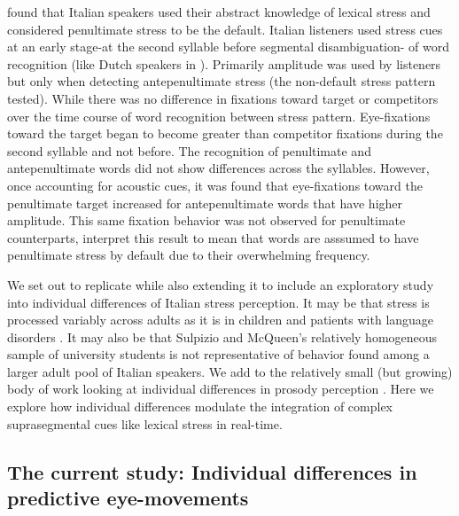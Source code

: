\cite{Sulpizio_McQueen_2012} found that Italian speakers used their abstract knowledge of lexical stress and considered penultimate stress to be the default. Italian listeners used stress cues at an early stage-at the second syllable before segmental disambiguation- of word recognition (like Dutch speakers in \cite{Reinisch2010}). Primarily amplitude was used by listeners but only when detecting antepenultimate stress (the non-default stress pattern tested). While there was no difference in fixations toward target or competitors over the time course of word recognition between stress pattern. Eye-fixations toward the target began to become greater than competitor fixations during the second syllable and not before. The recognition of penultimate and antepenultimate words did not show differences across the syllables. However, once accounting for acoustic cues, it was found that eye-fixations toward the penultimate target increased for antepenultimate words that have higher amplitude. This same fixation behavior was not observed for penultimate counterparts, \cite{Sulpizio_McQueen_2012} interpret this result to mean that words are asssumed to have penultimate stress by default due to their overwhelming frequency. 

We set out to replicate \cite{Sulpizio_McQueen_2012}  while also extending it to include an exploratory study into individual differences of Italian stress perception. It may be that stress is processed variably across adults as it is in children \citep[e.g.,][]{Colombo2014} and patients with language disorders \citep[e.g.,][]{Cappa1997}. It may also be that Sulpizio and McQueen's relatively homogeneous sample of university students is not representative of behavior found among a larger adult pool of Italian speakers. We add to the relatively small (but growing) body of work looking at individual differences in prosody perception \citep[e.g.,][]{Roy2017,Bishop2017,Lameris2023}. Here we explore how individual differences modulate the integration of complex suprasegmental cues like lexical stress in real-time.


\subsection{The current study: Individual differences in predictive eye-movements}

